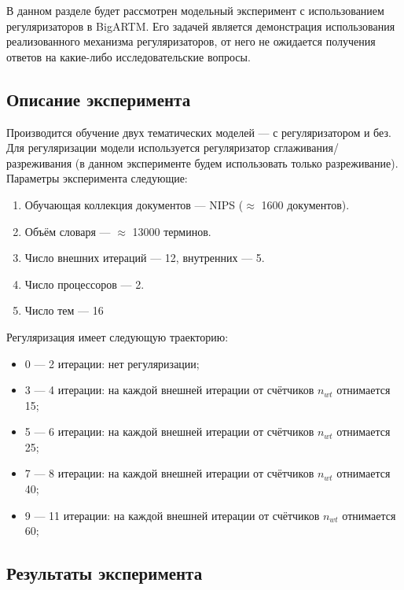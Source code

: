 
В данном разделе будет рассмотрен модельный эксперимент с использованием регуляризаторов в BigARTM. Его задачей является демонстрация использования реализованного механизма регуляризаторов, от него не ожидается получения ответов на какие-либо исследовательские вопросы.

\subsection{Описание эксперимента} 
Производится обучение двух тематических моделей --- с регуляризатором и без. Для регуляризации модели используется регуляризатор сглаживания/разреживания (в данном эксперименте будем использовать только разреживание). Параметры эксперимента следующие:

\begin{enumerate}
	\item Обучающая коллекция документов --- NIPS ($\approx$ 1600 документов).
	\item Объём словаря --- $\approx$ 13000 терминов.
	\item Число внешних итераций --- 12, внутренних --- 5.
	\item Число процессоров --- 2.
	\item Число тем --- 16
\end{enumerate} 

Регуляризация имеет следующую траекторию:
\begin{itemize}
	\item 0 --- 2 итерации: нет регуляризации;
	\item 3 --- 4 итерации: на каждой внешней итерации от счётчиков $n_{wt}$ отнимается 15;
	\item 5 --- 6 итерации: на каждой внешней итерации от счётчиков $n_{wt}$ отнимается 25;
	\item 7 --- 8 итерации:  на каждой внешней итерации от счётчиков $n_{wt}$ отнимается 40;
	\item 9 --- 11 итерации: на каждой внешней итерации от счётчиков $n_{wt}$ отнимается 60;
\end{itemize}

\subsection{Результаты эксперимента}

